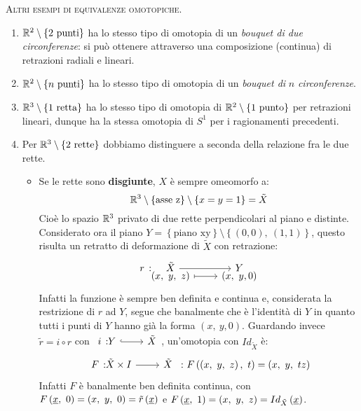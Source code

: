 \begin{examples}\textsc{Altri esempi di equivalenze omotopiche.}
	\begin{enumerate}
		\item $\mathbb{R}^2\setminus\left\{2\text{ punti}\right\}$ ha lo stesso tipo di omotopia di un \textit{bouquet di due circonferenze}: si può ottenere attraverso una composizione (continua) di retrazioni radiali e lineari.
		\item $\mathbb{R}^2\setminus\left\{n\text{ punti}\right\}$ ha lo stesso tipo di omotopia di un \textit{bouquet di} $n$ \textit{circonferenze}.
		\item $\mathbb{R}^3\setminus\left\{1\text{ retta}\right\}$ ha lo stesso tipo di omotopia di $\mathbb{R}^2\setminus\left\{1\text{ punto}\right\}$ per retrazioni lineari, dunque ha la stessa omotopia di $S^1$ per i ragionamenti precedenti.
		\item Per $\mathbb{R}^3\setminus\left\{2\text{ rette}\right\}$ dobbiamo distinguere a seconda della relazione fra le due rette.
		\begin{itemize}
			\item Se le rette sono \textbf{disgiunte}, $X$ è sempre omeomorfo a:
			\begin{equation*}
				\mathbb{R}^3\setminus\left\{\text{asse z}\right\}\setminus\left\{x=y=1\right\}=\tilde{X}
			\end{equation*}
		Cioè lo spazio $\mathbb{R}^3$ privato di due rette perpendicolari al piano e distinte.\\
			Considerato ora il piano $Y=\left\{\text{piano xy}\right\}\setminus\left\{\left(0,0\right),\ \left(1,1\right)\right\}$, questo risulta un retratto di deformazione di $\tilde{X}$ con retrazione:
			\begin{equation*}
				\funztot{r}{\tilde{X}}{Y}{\left(x,\ y,\ z\right)}{\left(x,\ y, 0\right)}
			\end{equation*}
		Infatti la funzione è sempre ben definita e continua e, considerata la restrizione di $r$ ad $Y$, segue che banalmente che è l'identità di $Y$ in quanto tutti i punti di $Y$ hanno già la forma $\left(x,\ y, 0\right)$. Guardando invece $\tilde{r}=i\circ r$ con $\incl{i}{Y}{\tilde{X}}$, un'omotopia con $Id_{\tilde{X}}$ è:
		\begin{equation*}
			\funz{F}{\tilde{X}\times I}{\tilde{X}}\ \colon \mvf{F}{\left(x,\ y,\ z\right)}{t}=\left(x,\ y,\ tz\right)
		\end{equation*}
		Infatti $F$ è banalmente ben definita continua, con $\mvf{F}{\underline{x}}{0}=\left(x,\ y,\ 0\right)=\tilde{r}\left(\underline{x}\right)$ e $\mvf{F}{\underline{x}}{1}=\left(x,\ y,\ z\right)=Id_{\tilde{X}}\left(\underline{x}\right)$.\\

\end{itemize}
\end{enumerate}
\end{examples}

